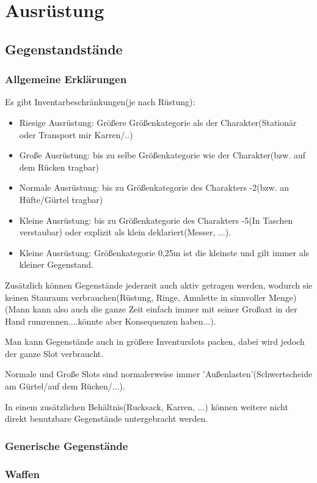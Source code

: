\part{Ausrüstung}
\chapter{Gegenstandstände}
\section{Allgemeine Erklärungen}
Es gibt Inventarbeschränkungen(je nach Rüstung):
\begin{itemize}
\item Riesige Ausrüstung: Größere Größenkategorie als der Charakter(Stationär oder Transport mir Karren/..)
\item Große Ausrüstung: bis zu selbe Größenkategorie wie der Charakter(bzw. auf dem Rücken tragbar)
\item Normale Ausrüstung: bis zu Größenkategorie des Charakters -2(bzw. an Hüfte/Gürtel tragbar)
\item Kleine Ausrüstung: bis zu Größenkategorie des Charakters -5(In Taschen verstaubar) oder explizit als klein deklariert(Messer, ...).
\item Kleine Ausrüstung: Größenkategorie 0,25m ist die kleinste und gilt immer als kleiner Gegenstand.
\end{itemize}
Zusätzlich können Gegenstände jederzeit auch aktiv getragen werden, wodurch sie keinen Stauraum verbrauchen(Rüstung, Ringe, Amulette in sinnvoller Menge)(Mann kann also auch die ganze Zeit einfach immer mit seiner Großaxt in der Hand rumrennen....könnte aber Konsequenzen haben...).

Man kann Gegenstände auch in größere Inventurslots packen, dabei wird jedoch der ganze Slot verbraucht.

Normale und Große Slots sind normalerweise immer 'Außenlasten'(Schwertscheide am Gürtel/auf dem Rücken/...).

In einem zusätzlichen Behältnis(Rucksack, Karren, ...) können weitere nicht direkt benutzbare Gegenstände untergebracht werden.
\section{Generische Gegenstände}
\section{Waffen}

